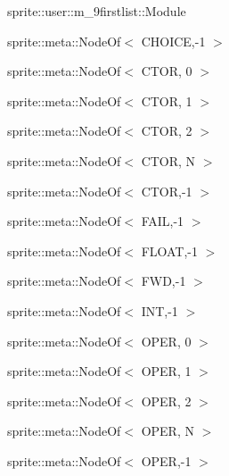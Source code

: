 \begin{CompactList}
\begin{CompactList}
\begin{CompactList}
\item sprite::user::m\_\-9firstlist::Module\end{CompactList}
\end{CompactList}
\item {}
\begin{CompactList}
\item {}
\end{CompactList}
\item sprite::meta::Node\-Of$<$ CHOICE,-1 $>$\item sprite::meta::Node\-Of$<$ CTOR, 0 $>$\item sprite::meta::Node\-Of$<$ CTOR, 1 $>$\item sprite::meta::Node\-Of$<$ CTOR, 2 $>$\item sprite::meta::Node\-Of$<$ CTOR, N $>$\item sprite::meta::Node\-Of$<$ CTOR,-1 $>$\item sprite::meta::Node\-Of$<$ FAIL,-1 $>$\item sprite::meta::Node\-Of$<$ FLOAT,-1 $>$\item sprite::meta::Node\-Of$<$ FWD,-1 $>$\item sprite::meta::Node\-Of$<$ INT,-1 $>$\item sprite::meta::Node\-Of$<$ OPER, 0 $>$\item sprite::meta::Node\-Of$<$ OPER, 1 $>$\item sprite::meta::Node\-Of$<$ OPER, 2 $>$\item sprite::meta::Node\-Of$<$ OPER, N $>$\item sprite::meta::Node\-Of$<$ OPER,-1 $>$\item {}
\item {}
\item {}
\item {}
\item {}
\item {}

\end{CompactList}
